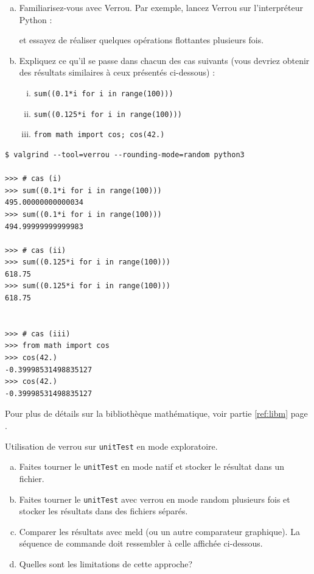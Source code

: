 \documentclass[a4paper]{article}
\newenvironment{commandline}{
  \begin{mdframed}[style=commandline]
}{
  \end{mdframed}
}
\newcounter{Question}
\newenvironment{question}[1][\unskip]{
  \bigskip
  \stepcounter{Question}
  \def\questionTitle{ #1}
  \begin{mdframed}[style=question]
  }{
  \end{mdframed}
}
\begin{document}
\begin{question}
  \begin{enumerate}[(a)]
  \item Familiarisez-vous avec Verrou. Par exemple, lancez Verrou sur
    l'interpréteur Python :

  
    et essayez de réaliser quelques opérations flottantes plusieurs fois.

  \item Expliquez ce qu'il se passe dans chacun des cas suivants (vous devriez
    obtenir des résultats similaires à ceux présentés ci-dessous) :
    \begin{enumerate}[(i)]
    \item {\tt sum((0.1*i for i in range(100)))}
    \item {\tt sum((0.125*i for i in range(100)))}
    \item {\tt from math import cos; cos(42.)}
    \end{enumerate}
  \end{enumerate}
\end{question}
\begin{commandline}
\begin{verbatim}
$ valgrind --tool=verrou --rounding-mode=random python3

>>> # cas (i)
>>> sum((0.1*i for i in range(100)))
495.00000000000034
>>> sum((0.1*i for i in range(100)))
494.99999999999983

>>> # cas (ii)
>>> sum((0.125*i for i in range(100)))
618.75
>>> sum((0.125*i for i in range(100)))
618.75


>>> # cas (iii)
>>> from math import cos
>>> cos(42.)
-0.39998531498835127
>>> cos(42.)
-0.39998531498835127
\end{verbatim}
\end{commandline}
Pour plus de détails sur la bibliothèque mathématique, voir partie \ref{ref:libm} page \pageref{ref:libm}.

\bigskip

\begin{question}
  Utilisation de verrou sur \texttt{unitTest} en mode exploratoire.
  \begin{enumerate}[(a)]
  \item Faites tourner le \texttt{unitTest} en mode natif et stocker le résultat
    dans un fichier.
  \item Faites tourner le \texttt{unitTest} avec verrou en mode random plusieurs
    fois et stocker les résultats dans des fichiers séparés.
  \item Comparer les résultats avec meld (ou un autre comparateur
    graphique). La séquence de commande doit ressembler à celle
    affichée ci-dessous.
  \item Quelles sont les limitations de cette approche?
  \end{enumerate}
\end{question}
\end{document}
